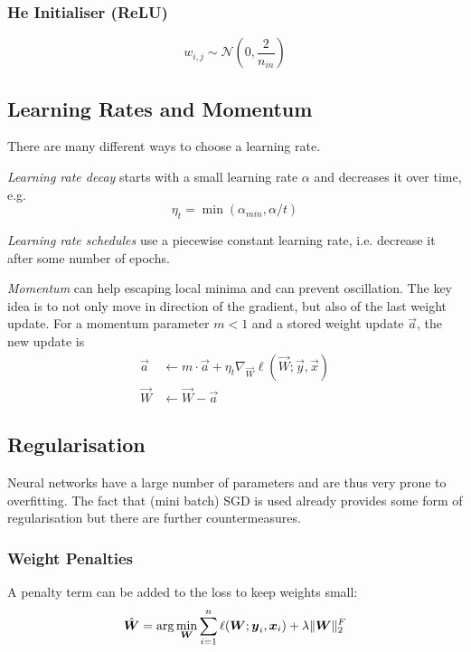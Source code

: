 \subsubsection{He Initialiser (ReLU)}
\begin{equation*}
w_{i,j} \sim \mathcal{N}\left(0, \frac{2}{n_{in}}\right)
\end{equation*}


\subsection{Learning Rates and Momentum}
There are many different ways to choose a learning rate.

\emph{Learning rate decay} starts with a small
learning rate $\alpha$ and decreases it over time,
e.g.
\begin{equation*}
\eta_t = \min(\alpha_{min}, \alpha / t)
\end{equation*}

\emph{Learning rate schedules} use a piecewise constant
learning rate, i.e. decrease it after some number of epochs.

\emph{Momentum} can help escaping local minima and
can prevent oscillation.
The key idea is to not only move in direction of the gradient,
but also of the last weight update.
For a momentum parameter $m < 1$ and a stored weight update
$\vec{a}$, the new update is
\begin{align*}
\vec{a} &\gets m \cdot \vec{a} + \eta_t \nabla_{\vec{W}} \ell(\vec{W}; \vec{y}, \vec{x}) \\
\vec{W} &\gets \vec{W} - \vec{a}
\end{align*}


\subsection{Regularisation}
Neural networks have a large number of parameters and are thus
very prone to overfitting.
The fact that (mini batch) SGD is used already provides some
form of regularisation but there are further countermeasures.

\subsubsection{Weight Penalties}
A penalty term can be added to the loss to keep weights small:
\begin{equation*}
\hat{\boldsymbol{W}} = \arg\min_{\boldsymbol{W}}{
	\sum_{i=1}^n{\ell(\boldsymbol{W}; \boldsymbol{y}_i, \boldsymbol{x}_i)}
	+ \lambda \lVert\boldsymbol{W}\rVert_2^F
}
\end{equation*}

